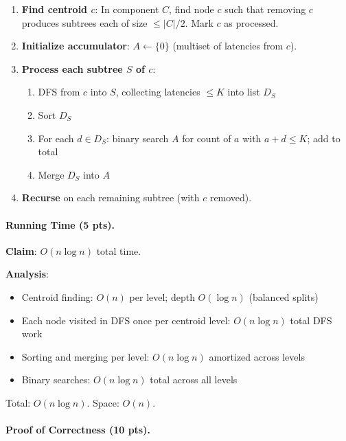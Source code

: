 \documentclass[sigconf]{acmart}
\begin{document}
\begin{enumerate}[leftmargin=*, itemsep=0.4em]
\item \textbf{Find centroid $c$}: In component $C$, find node $c$ such that removing $c$ produces subtrees each of size $\leq |C|/2$. Mark $c$ as processed.

\item \textbf{Initialize accumulator}: $A \leftarrow \{0\}$ (multiset of latencies from $c$).

\item \textbf{Process each subtree $S$ of $c$}:
\begin{enumerate}[itemsep=0.2em]
\item DFS from $c$ into $S$, collecting latencies $\leq K$ into list $D_S$
\item Sort $D_S$
\item For each $d \in D_S$: binary search $A$ for count of $a$ with $a + d \leq K$; add to total
\item Merge $D_S$ into $A$
\end{enumerate}

\item \textbf{Recurse} on each remaining subtree (with $c$ removed).
\end{enumerate}

\paragraph{Running Time (5 pts).}

\textbf{Claim}: $O(n \log n)$ total time.

\textbf{Analysis}:

\begin{itemize}[itemsep=0.2em]
\item Centroid finding: $O(n)$ per level; depth $O(\log n)$ (balanced splits)
\item Each node visited in DFS once per centroid level: $O(n \log n)$ total DFS work
\item Sorting and merging per level: $O(n \log n)$ amortized across levels
\item Binary searches: $O(n \log n)$ total across all levels
\end{itemize}

Total: $O(n \log n)$. Space: $O(n)$.

\paragraph{Proof of Correctness (10 pts).}
\end{document}
